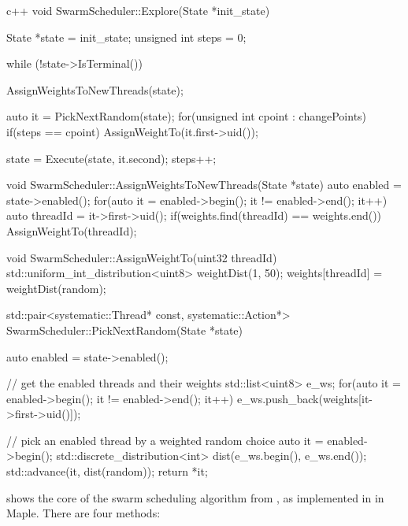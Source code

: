 \begin{listing}
\centering
\begin{cminted}{c++}
void SwarmScheduler::Explore(State *init_state) {
  State *state = init_state;
  unsigned int steps = 0;

  while (!state->IsTerminal()) {
    AssignWeightsToNewThreads(state);

    auto it = PickNextRandom(state);
    for(unsigned int cpoint : changePoints) {
      if(steps == cpoint) {
        AssignWeightTo(it.first->uid());
      }
    }

    state = Execute(state, it.second);
    steps++;
  }
}

void SwarmScheduler::AssignWeightsToNewThreads(State *state) {
  auto enabled = state->enabled();
  for(auto it = enabled->begin(); it != enabled->end(); it++) {
    auto threadId = it->first->uid();
    if(weights.find(threadId) == weights.end()) {
      AssignWeightTo(threadId);
    }
  }
}

void SwarmScheduler::AssignWeightTo(uint32 threadId) {
  std::uniform_int_distribution<uint8> weightDist(1, 50);
  weights[threadId] = weightDist(random);
}

std::pair<systematic::Thread* const, systematic::Action*>
SwarmScheduler::PickNextRandom(State *state) {
  auto enabled = state->enabled();

  // get the enabled threads and their weights
  std::list<uint8> e_ws;
  for(auto it = enabled->begin(); it != enabled->end(); it++) {
    e_ws.push_back(weights[it->first->uid()]);
  }

  // pick an enabled thread by a weighted random choice
  auto it = enabled->begin();
  std::discrete_distribution<int> dist(e_ws.begin(), e_ws.end());
  std::advance(it, dist(random));
  return *it;
}
\end{cminted}
\caption{The core of the {C\raisebox{.3ex}{++}} swarm scheduling algorithm, implemented in Maple.}\label{lst:swarm}
\end{listing}

 shows the core of the swarm scheduling algorithm from
, as implemented in \CPP{} in Maple.  There are four
methods:

